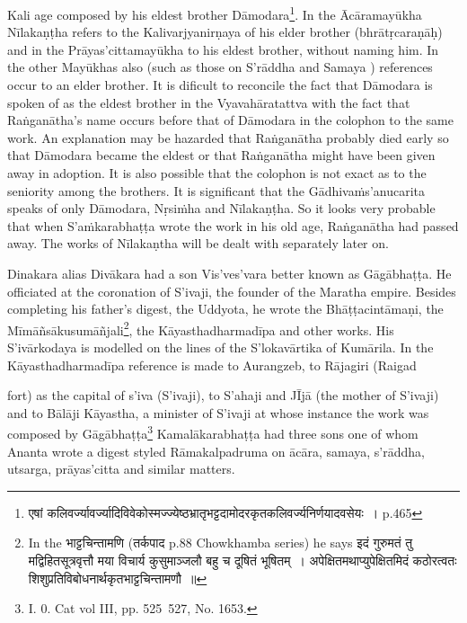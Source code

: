 \documentclass[11pt, openany]{book}
\begin{document}
\noindent
Kali age composed by his eldest brother Dāmodara\renewcommand{\thefootnote}{1}\footnote{एषां कलिवर्ज्यावर्ज्यादिविवेकोस्मज्ज्येष्ठभ्रातृभट्टदामोदरकृतकलिवर्ज्यनिर्णयादवसेयः~। p.465}. In the Ācāramayūkha Nīlakaṇṭha refers to the Kalivarjyanirṇaya of his elder brother (bhrātṛcaraṇāḥ) and in the Prāyas'cittamayūkha to his eldest brother, without naming him. In the other Mayūkhas also (such as those on S'rāddha and Samaya ) references occur to an elder brother. It is dificult to reconcile the fact that Dāmodara is spoken of as the eldest brother in the Vyavahāratattva with the fact that Raṅganātha's name occurs before that of Dāmodara in the colophon to the same work. An explanation may be hazarded that Raṅganātha probably died early so that Dāmodara became the eldest or that Raṅganātha might have been given away in adoption. It is also possible that the colophon is not exact as to the seniority among the brothers. It is significant that the Gādhivaṁs'anucarita speaks of only Dāmodara, Nṛsiṁha and Nīlakaṇṭha. So it looks very probable that when S'aṁkarabhaṭṭa wrote the work in his old age, Raṅganātha had passed away. The works of Nīlakaṇtha will be dealt with separately later on.

Dinakara alias Divākara had a son Vis'ves'vara better known as Gāgābhaṭṭa. He officiated at the coronation of S'ivaji, the founder of the Maratha empire. Besides completing his father's digest, the Uddyota, he wrote the Bhāṭṭacintāmaṇi, the Mīmāñsākusumāñjali\renewcommand{\thefootnote}{2}\footnote{In the भाट्टचिन्तामणि (तर्कपाद p.88 Chowkhamba series) he says {\qt इदं गुरुमतं तु मद्विहितसूत्रवृत्तौ मया विचार्य कुसुमाञ्जलौ बहु च दूषितं भूषितम्~। अपेक्षितमथाप्युपेक्षितमिदं कठोरत्वतः शिशुप्रतिविबोधनार्थकृतभाट्टचिन्तामणौ~॥}}, the Kāyasthadharmadīpa and other works. His S'ivārkodaya is modelled on the lines of the S'lokavārtika of Kumārila. In the Kāyasthadharmadīpa reference is made to Aurangzeb, to Rājagiri (Raigad

\newpage

\noindent
fort) as the capital of s'iva (S'ivaji), to S'ahaji and JĪjā (the mother of S'ivaji) and to Bālāji Kāyastha, a minister of S'ivaji at whose instance the work was composed by Gāgābhaṭṭa\renewcommand{\thefootnote}{1}\footnote{I. 0. Cat vol III, pp. 525\textendash\ 527, No. 1653.} Kamalākarabhaṭṭa had three sons one of whom Ananta wrote a digest styled Rāmakalpadruma on ācāra, samaya, s'rāddha, utsarga, prāyas'citta and similar matters.
\end{document}
